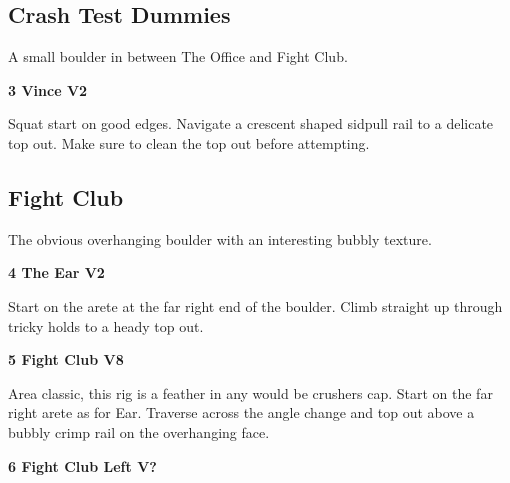 \begin{multicols}{2}
			\subsection*{Crash Test Dummies}\label{bf:Crash Test Dummies}
			\begin{minipage}{\columnwidth}
			A small boulder in between The Office and Fight Club.
			\end{minipage}
			
					\begin{minipage}{\linewidth}	
					\label{rt:Vince}
\colorbox{green!20}{
\textbf{
3 Vince V2    
}
}

					\begin{adjustwidth}{0.5cm}{}				
					Squat start on good edges. Navigate a crescent shaped sidpull rail to a delicate top out. Make sure to clean the top out before attempting.
					\end{adjustwidth}
					\end{minipage}
			\subsection*{Fight Club}\label{bf:Fight Club}
			\begin{minipage}{\columnwidth}
			The obvious overhanging boulder with an interesting bubbly texture.
			\end{minipage}
			
\label{pt:Fight Club}
					\begin{minipage}{\linewidth}	
					\label{rt:The Ear}
\colorbox{green!20}{
\textbf{
4 The Ear V2     
}
}

					\begin{adjustwidth}{0.5cm}{}				
					Start on the arete at the far right end of the boulder. Climb straight up through tricky holds to a heady top out.
					\end{adjustwidth}
					\end{minipage}


					\begin{minipage}{\linewidth}	
					\label{rt:Fight Club}
\colorbox{Goldenrod!50}{
\textbf{
5 Fight Club V8     
}
}

					\begin{adjustwidth}{0.5cm}{}				
					Area classic, this rig is a feather in any would be crushers cap. Start on the far right arete as for Ear. Traverse across the angle change and top out above a bubbly crimp rail on the overhanging face.
					\end{adjustwidth}
					\end{minipage}
					\begin{minipage}{\linewidth}	
					\label{rt:Fight Club Left}
\colorbox{black!20}{
\textbf{
6 Fight Club Left V?  
}
}


\end{minipage}
\end{multicols}
